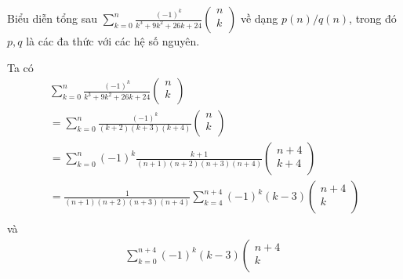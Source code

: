 \begin{baitap}
Biểu diễn tổng sau 
$\sum\limits_{k = 0}^n {\frac{{\left( { - 1} \right)^k }}{{k^3  + 9k^2  + 26k + 24}}} \left( \begin{array}{l}
 n \\ 
 k \\ 
 \end{array} \right)$
về dạng $p(n)/q(n)$, trong đó $p, q$ là các đa thức với các hệ số nguyên.

\begin{loigiai3}
 Ta có 
\[
\begin{array}{l}
 \sum\limits_{k = 0}^n {\frac{{\left( { - 1} \right)^k }}{{k^3  + 9k^2  + 26k + 24}}} \left( \begin{array}{l}
 n \\ 
 k \\ 
 \end{array} \right) \\ 
  = \sum\limits_{k = 0}^n {\frac{{\left( { - 1} \right)^k }}{{\left( {k + 2} \right)\left( {k + 3} \right)\left( {k + 4} \right)}}} \left( \begin{array}{l}
 n \\ 
 k \\ 
 \end{array} \right) \\ 
  = \sum\limits_{k = 0}^n {\left( { - 1} \right)^k } \frac{{k + 1}}{{\left( {n + 1} \right)\left( {n + 2} \right)\left( {n + 3} \right)\left( {n + 4} \right)}}\left( \begin{array}{l}
 n + 4 \\ 
 k + 4 \\ 
 \end{array} \right) \\ 
  = \frac{1}{{\left( {n + 1} \right)\left( {n + 2} \right)\left( {n + 3} \right)\left( {n + 4} \right)}}\sum\limits_{k = 4}^{n + 4} {\left( { - 1} \right)^k \left( {k - 3} \right)} \left( \begin{array}{c}
 n + 4 \\ 
 k \\ 
 \end{array} \right) \\ 
 \end{array}
\]
và 
\[
\begin{array}{l}
 \sum\limits_{k = 0}^{n + 4} {\left( { - 1} \right)^k } \left( {k - 3} \right)\left( \begin{array}{c}
 n + 4 \\ 
 k \\ 

\end{array}
\end{array}\]
\end{loigiai3}
\end{baitap}
